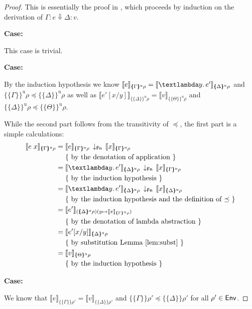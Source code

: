 \documentclass{scrartcl}
\theoremstyle{nonumberbreak}
\newtheorem{proof}{Proof}
\newcommand{\sEnv}  {\text{\textsf{Env}}}
\newcommand{\sFnProj}[2]{#1\,\downarrow_{\text{\textsf{Fn}}}\,#2}
\newcommand{\sApp}[2]{#1\;#2}
\newcommand{\sLam}[2]{\text{\textlambda} #1.\, #2}
\newcommand{\sred}[4]{#1 : #2 \Downarrow #3 : #4}
\newcommand{\sRule}[1]{\text{{\textsc{#1}}}}
\newcommand{\dsem}[2]{\llbracket #1 \rrbracket_{#2}}
\newcommand{\esem}[1]{\{\!\!\!\{#1\}\!\!\!\}}
\newcommand{\esemu}[1]{\{\!\!\!\{#1\}\!\!\!\}^{\text{u}}}
\newcommand{\case}[1]{\par\smallskip\noindent\textbf{Case:} #1\nopagebreak\par\noindent\ignorespaces}
\newcommand{\aexpl}[1]{&\mathrel{\phantom{=}}\left\{\text{ #1 }\right\}}
\begin{document}
\begin{proof}
This is essentially the proof in \cite{launchbury}, which proceeds by induction on the derivation of $\sred \Gamma e \Delta v$.

\case{\sRule{Lam}}
This case is trivial.

\case{\sRule{App}}
By the induction hypothesis we know
$\dsem{e}{\esemu{\Gamma}\rho} = \dsem{\sLam y {e'}}{\esemu{\Delta}\rho}$ and $\esemu{\Gamma}\rho \preceq \esemu{\Delta}\rho$ as well as $\dsem{e'[x/y]}{\esemu{\Delta}\rho} = \dsem{v}{\esemu{\Theta}\rho}$ and $\esemu{\Delta}\rho \preceq \esemu{\Theta}\rho$.

While the second part follows from the transitivity of $\preceq$, the first part is a simple calculations:
\begin{align*}
\dsem{\sApp{e}{x}}{\esemu{\Gamma}\rho} &= \sFnProj{\dsem{e}{\esemu{\Gamma}\rho}}{\dsem{x}{\esemu{\Gamma}{\rho}}}\\
\aexpl{by the denotation of application} \\
&= \sFnProj{\dsem{\sLam y {e'}}{\esemu{\Delta}\rho}}{\dsem{x}{\esemu{\Gamma}{\rho}}}\\ 
\aexpl{by the induction hypothesis} \\
&= \sFnProj{\dsem{\sLam y {e'}}{\esemu{\Delta}\rho}}{\dsem{x}{\esemu{\Delta}{\rho}}}\\ 
\aexpl{by the induction hypothesis and the definition of $\preceq$} \\
&= \dsem{e'}{(\esemu{\Delta}\rho)(y \mapsto \dsem{x}{\esemu{\Gamma}{\rho}})}\\ 
\aexpl{by the denotation of lambda abstraction} \\
&= \dsem{e'[x/y]}{\esemu{\Delta}\rho}\\ 
\aexpl{by substitution Lemma \ref{lem:subst}} \\
&= \dsem{v}{\esemu{\Theta}\rho}\\
\aexpl{by the induction hypothesis}
\end{align*}

\case{\sRule{Var}}
We know that $\dsem{e}{\esem{\Gamma}\rho'}=\dsem{v}{\esem{\Delta}\rho'}$ and $\esem{\Gamma}\rho' \preceq \esem{\Delta}\rho'$ for all $\rho'\in\sEnv$.


\end{proof}
\end{document}
